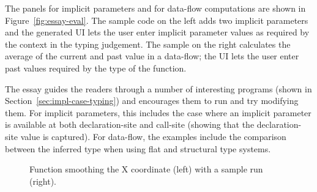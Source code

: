 The panels for implicit parameters and for data-flow computations are shown in Figure~\ref{fig:essay-eval}.
The sample code on the left adds two implicit parameters and the generated UI lets the user
enter implicit parameter values as required by the context in the typing judgement. The sample on
the right calculates the average of the current and past value in a data-flow; the UI lets the user
enter past values required by the type of the function.

The essay guides the readers through a number of interesting programs (shown in Section~\ref{sec:impl-case-typing})
and encourages them to run and try modifying them. For implicit parameters, this includes the case
where an implicit parameter is available at both declaration-site and call-site (showing that the
declaration-site value is captured). For data-flow, the examples include the comparison between the
inferred type when using flat and structural type systems.


\begin{figure}[t]
\caption{Function smoothing the X coordinate (left) with a sample run (right).}
\label{fig:essay-df}
\end{figure}

